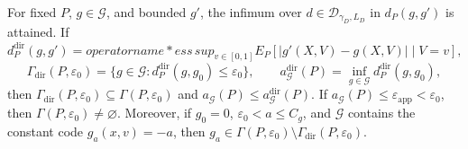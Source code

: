 For fixed \(P\), \(g\in\mathcal G\), and bounded \(g'\), the infimum over \(d\in\mathcal D_{\gamma_D,L_D}\) in \(d_P(g,g')\) is attained.  If
\[
 d_P^{\mathrm{dir}}(g,g')=operatorname*{ess\,sup}_{v\in[0,1]}
 E_P[|g'(X,V)-g(X,V)|\mid V=v],
\]
\[
 \Gamma_{\mathrm{dir}}(P,\varepsilon_0)
 =\{g\in\mathcal G:d_P^{\mathrm{dir}}(g,g_0)\le\varepsilon_0\},
 \qquad
 a_{\mathcal G}^{\mathrm{dir}}(P)=\inf_{g\in\mathcal G}d_P^{\mathrm{dir}}(g,g_0),
\]
then \(\Gamma_{\mathrm{dir}}(P,\varepsilon_0)\subseteq\Gamma(P,\varepsilon_0)\) and \(a_{\mathcal G}(P)\le a_{\mathcal G}^{\mathrm{dir}}(P)\).  If \(a_{\mathcal G}(P)\le\varepsilon_{\mathrm{app}}<\varepsilon_0\), then \(\Gamma(P,\varepsilon_0)\ne\varnothing\).  Moreover, if \(g_0=0\), \(\varepsilon_0<a\le C_g\), and \(\mathcal G\) contains the constant code \(g_a(x,v)=-a\), then \(g_a\in\Gamma(P,\varepsilon_0)\setminus\Gamma_{\mathrm{dir}}(P,\varepsilon_0)\).